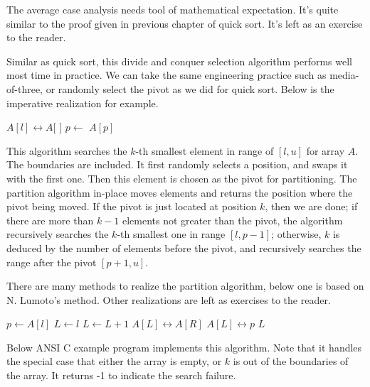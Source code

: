 \documentclass[UTF8]{article}
\begin{document}
The average case analysis needs tool of mathematical expectation. It's quite similar to the
proof given in previous chapter of quick sort. It's left as an exercise to the reader.

Similar as quick sort, this divide and conquer selection algorithm performs well most time
in practice. We can take the same engineering practice such as media-of-three, or randomly
select the pivot as we did for quick sort. Below is the imperative realization for example.

\begin{algorithmic}[1]
  \State {} $A[l] \leftrightarrow A[$  $]$ 
  \State $p \gets$ 
    \State \Return $A[p]$
  \EndIf
    \State \Return {}
  \EndIf
  \State \Return {}
\EndFunction
\end{algorithmic}

This algorithm searches the $k$-th smallest element in range of $[l, u]$ for array $A$. The boundaries
are included. It first randomly selects a position, and swaps it with the first one. Then this element
is chosen as the pivot for partitioning. The partition algorithm in-place moves elements and
returns the position where the pivot being moved. If the pivot is just located at position $k$, then
we are done; if there are more than $k-1$ elements not greater than the pivot, the algorithm
recursively searches the $k$-th smallest one in range $[l, p-1]$; otherwise, $k$ is deduced by the
number of elements before the pivot, and recursively searches the range after the pivot $[p+1, u]$.

There are many methods to realize the partition algorithm, below one is based on N. Lumoto's method.
Other realizations are left as exercises to the reader.

\begin{algorithmic}[1]
  \State $p \gets A[l]$
  \State $L \gets l$
      \State $L \gets L + 1$
      \State {} $A[L] \leftrightarrow A[R]$
    \EndIf
  \EndFor
  \State {} $A[L] \leftrightarrow p$
  \State \Return $L$
\EndFunction
\end{algorithmic}

Below ANSI C example program implements this algorithm. Note that it handles the special case that
either the array is empty, or $k$ is out of the boundaries of the array. It returns -1 to indicate
the search failure.
\end{document}
